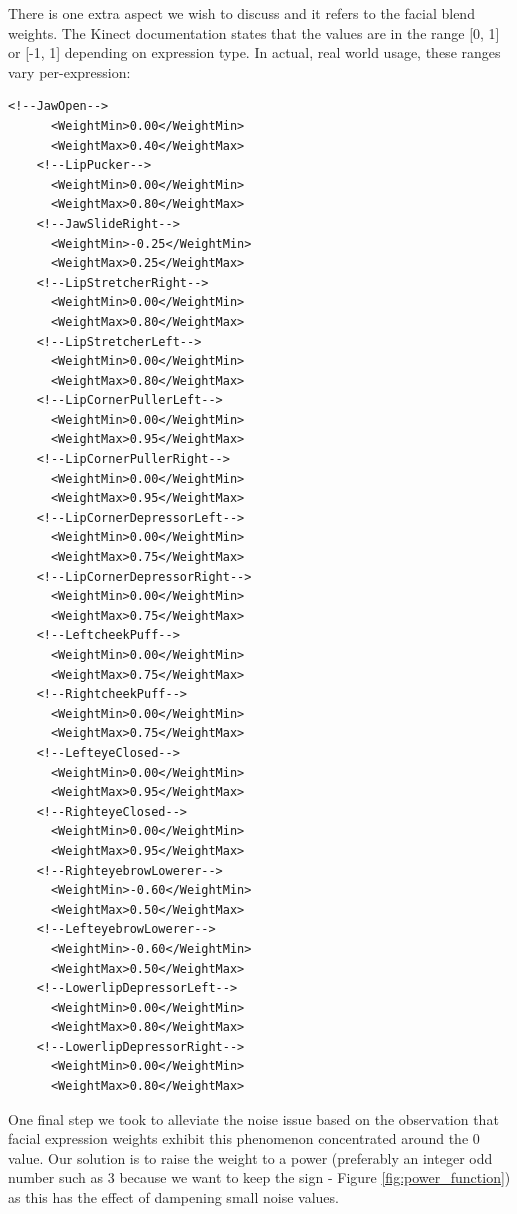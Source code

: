 \documentclass[a4paper, 12pt]{amsart}
\begin{document}
There is one extra aspect we wish to discuss and it refers to the facial blend weights. The Kinect documentation states that the values are in the range [0, 1] or [-1, 1] depending on expression type. In actual, real world usage, these ranges vary per-expression:

\begin{lstlisting}[basicstyle=\tiny]
    <!--JawOpen-->
      <WeightMin>0.00</WeightMin>
      <WeightMax>0.40</WeightMax>
    <!--LipPucker-->
      <WeightMin>0.00</WeightMin>
      <WeightMax>0.80</WeightMax>
    <!--JawSlideRight-->
      <WeightMin>-0.25</WeightMin>
      <WeightMax>0.25</WeightMax>
    <!--LipStretcherRight-->
      <WeightMin>0.00</WeightMin>
      <WeightMax>0.80</WeightMax>
    <!--LipStretcherLeft-->
      <WeightMin>0.00</WeightMin>
      <WeightMax>0.80</WeightMax>
    <!--LipCornerPullerLeft-->
      <WeightMin>0.00</WeightMin>
      <WeightMax>0.95</WeightMax>
    <!--LipCornerPullerRight-->
      <WeightMin>0.00</WeightMin>
      <WeightMax>0.95</WeightMax>
    <!--LipCornerDepressorLeft-->
      <WeightMin>0.00</WeightMin>
      <WeightMax>0.75</WeightMax>
    <!--LipCornerDepressorRight-->
      <WeightMin>0.00</WeightMin>
      <WeightMax>0.75</WeightMax>
    <!--LeftcheekPuff-->
      <WeightMin>0.00</WeightMin>
      <WeightMax>0.75</WeightMax>
    <!--RightcheekPuff-->
      <WeightMin>0.00</WeightMin>
      <WeightMax>0.75</WeightMax>
    <!--LefteyeClosed-->
      <WeightMin>0.00</WeightMin>
      <WeightMax>0.95</WeightMax>
    <!--RighteyeClosed-->
      <WeightMin>0.00</WeightMin>
      <WeightMax>0.95</WeightMax>
    <!--RighteyebrowLowerer-->
      <WeightMin>-0.60</WeightMin>
      <WeightMax>0.50</WeightMax>
    <!--LefteyebrowLowerer-->
      <WeightMin>-0.60</WeightMin>
      <WeightMax>0.50</WeightMax>
    <!--LowerlipDepressorLeft-->
      <WeightMin>0.00</WeightMin>
      <WeightMax>0.80</WeightMax>
    <!--LowerlipDepressorRight-->
      <WeightMin>0.00</WeightMin>
      <WeightMax>0.80</WeightMax>
\end{lstlisting}

One final step we took to alleviate the noise issue based on the observation that facial expression weights exhibit this phenomenon concentrated around the 0 value. Our solution is to raise the weight to a power (preferably an integer odd number such as 3 because we want to keep the sign - Figure \ref{fig:power_function}) as this has the effect of dampening small noise values.
\end{document}
